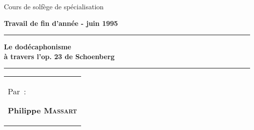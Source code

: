 \documentclass[11pt,a4paper]{scrreprt}
\begin{document}
\thispagestyle{empty}
\begin{center}
\begin{LARGE}
Cours de solfège de spécialisation
\end{LARGE}
\end{center}

\begin{center}
\begin{normalsize}
\textbf{Travail de fin d'année - juin 1995}
\end{normalsize}
\end{center}

\begin{center}
\vspace{5cm}
\noindent\rule{\textwidth}{0.5mm}
\begin{huge}
\textbf{Le dodécaphonisme\\à travers l'op. 23 de Schoenberg}
\end{huge}
\noindent\rule{\textwidth}{0.5mm}
\end{center}


\begin{tabular}{p{13.7cm}}
Par~: \begin{large}\textbf{Philippe \textsc{Massart}}
                          \end{large}
\end{tabular}\\
\end{document}
